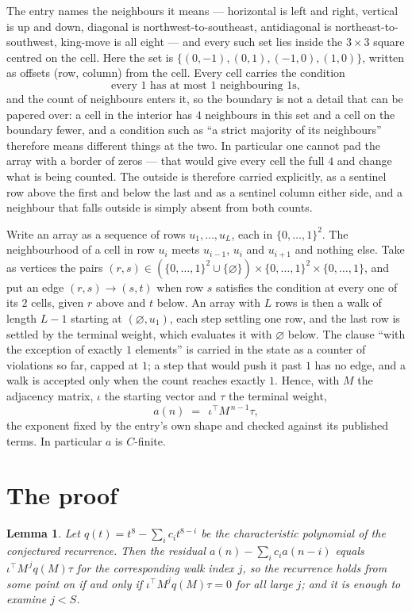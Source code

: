 \documentclass[11pt,a4paper]{article}
\theoremstyle{plain}
\newtheorem{lemma}[theorem]{Lemma}
\theoremstyle{definition}
\begin{document}
The entry names the neighbours it means --- horizontal is left and right, vertical is up and
down, diagonal is northwest-to-southeast, antidiagonal is northeast-to-southwest, king-move is
all eight --- and every such set lies inside the $3\times3$ square centred on the cell. Here
the set is $\{(0,-1), (0,1), (-1,0), (1,0)\}$, written as offsets (row, column) from the cell. Every cell carries
the condition
\[
\text{every 1 has at most 1 neighbouring 1s},
\]
and the count of neighbours enters it, so the boundary is not a detail that can be papered
over: a cell in the interior has $4$ neighbours in this set and a cell on the boundary
fewer, and a condition such as ``a strict majority of its neighbours'' therefore means
different things at the two. In particular one cannot pad the array with a border of zeros ---
that would give every cell the full $4$ and change what is being counted. The outside is
therefore carried
explicitly, as a sentinel row above the first and below the last and as a sentinel column
either side, and a neighbour that falls outside is simply absent from both counts.

Write an array as a sequence of rows $u_1,\dots,u_L$, each in
$\{0,\dots,1\}^{2}$. The neighbourhood of a cell in row $u_i$ meets $u_{i-1}$,
$u_i$ and $u_{i+1}$ and nothing else. Take as vertices the pairs
$(r,s)\in(\{0,\dots,1\}^{2}\cup\{\varnothing\})\times\{0,\dots,1\}^{2} \times \{0,\dots,1\}$,
and put an edge $(r,s)\to(s,t)$ when row $s$ satisfies the condition at every one of its
$2$ cells, given $r$ above and $t$ below. An array with $L$ rows is then a walk of length
$L-1$ starting at $(\varnothing,u_1)$, each step settling one row, and the last row is
settled by the terminal weight, which evaluates it with $\varnothing$ below. The clause ``with the exception of exactly $1$ elements'' is carried in
the state as a counter of violations so far, capped at $1$; a step that would push it past
$1$ has no edge, and a walk is accepted only when the count reaches exactly $1$. Hence,
with $M$ the adjacency matrix, $\iota$ the starting vector and $\tau$ the terminal weight,
\[
a(n)\;=\;\,\iota^{\!\top}M^{\,n-1}\tau ,
\]
the exponent fixed by the entry's own shape and checked against its published terms. In
particular $a$ is $C$-finite.

\section{The proof}

\begin{lemma}\label{lem:crit}
Let $q(t)=t^{8}-\sum_i c_it^{8-i}$ be the characteristic polynomial of the
conjectured recurrence. Then the residual $a(n)-\sum_ic_ia(n-i)$ equals
$\iota^{\!\top}M^{\,j}q(M)\tau$ for the corresponding walk index $j$, so the
recurrence holds from some point on if and only if $\iota^{\!\top}M^{j}q(M)\tau=0$ for all
large $j$; and it is enough to examine $j<S$.
\end{lemma}
\end{document}
